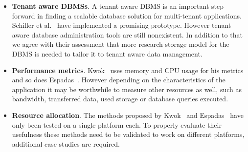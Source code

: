 \begin{itemize}
	\item \textbf{Tenant aware \acp{DBMS}}.
		A tenant aware \ac{DBMS} is an important step forward in finding a scalable database solution for multi-tenant applications.
		Schiller et al.~\cite{schiller2011native} have implemented a promising prototype. However tenant aware database administration tools are still nonexistent.
		In addition to that we agree with their assessment that more research storage model for the \ac{DBMS} is needed to tailor it to tenant aware data management.
	\item \textbf{Performance metrics}.
		Kwok~\cite{kwok2008resource} uses memory and CPU usage for his metrics and so does Espadas~\cite{espadas2013tenant}. 
		However depending on the characteristics of the application it may be worthwhile to measure other resources as well, such as bandwidth, transferred data, used storage or database queries executed. 
	\item \textbf{Resource allocation}.
		The methods proposed by Kwok~\cite{kwok2008resource} and Espadas~\cite{espadas2013tenant} have only been tested on a single platform each.
		To properly evaluate their usefulness these methods need to be validated to work on different platforms, additional case studies are required.
\end{itemize}
